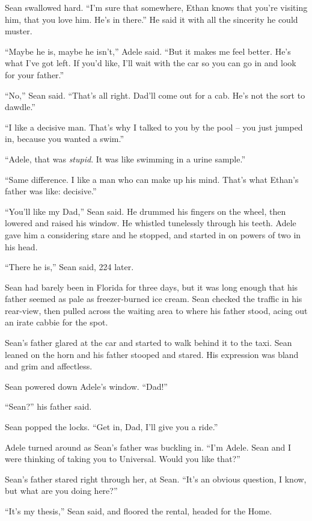 Sean swallowed hard. “I'm sure that somewhere, Ethan knows that 
you're visiting him, that you love him. He's in there.” He said it 
with all the sincerity he could muster.

“Maybe he is, maybe he isn't,” Adele said. “But it makes me feel 
better. He's what I've got left. If you'd like, I'll wait with the car 
so you can go in and look for your father.”

“No,” Sean said. “That's all right. Dad'll come out for a cab. 
He's not the sort to dawdle.”

“I like a decisive man. That's why I talked to you by the pool -- you 
just jumped in, because you wanted a swim.”

“Adele, that was \emph{stupid}. It was like swimming in a urine 
sample.”

“Same difference. I like a man who can make up his mind. That's what 
Ethan's father was like: decisive.”

“You'll like my Dad,” Sean said. He drummed his fingers on the 
wheel, then lowered and raised his window. He whistled tunelessly 
through his teeth. Adele gave him a considering stare and he stopped, 
and started in on powers of two in his head.

“There he is,” Sean said, 224 later.

Sean had barely been in Florida for three days, but it was long enough 
that his father seemed as pale as freezer-burned ice cream. Sean 
checked the traffic in his rear-view, then pulled across the waiting 
area to where his father stood, acing out an irate cabbie for the spot.

Sean's father glared at the car and started to walk behind it to the 
taxi. Sean leaned on the horn and his father stooped and stared. His 
expression was bland and grim and affectless.

Sean powered down Adele's window. “Dad!”

“Sean?” his father said.

Sean popped the locks. “Get in, Dad, I'll give you a ride.”

\tb

Adele turned around as Sean's father was buckling in. “I'm Adele. 
Sean and I were thinking of taking you to Universal. Would you like 
that?”

Sean's father stared right through her, at Sean. “It's an obvious 
question, I know, but what are you doing here?”

“It's my thesis,” Sean said, and floored the rental, headed for the 
Home.

